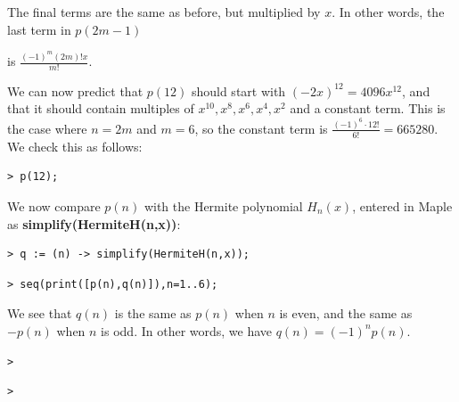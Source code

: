 \documentclass{article}
\begin{document}
\begin{Maple Normal}
The final terms are the same as before, but multiplied by 
$x$.  In other words, the last term in 
$p (2 m -1)$ 
\end{Maple Normal}
\begin{Maple Normal}
is 
$\frac{(-1)^{m} (2 m)! x}{m !}$. 
\end{Maple Normal}
\begin{Maple Normal}

\end{Maple Normal}
\begin{Maple Normal}
We can now predict that 
$p (12)$ should start with 
$(-2 x)^{12}=4096 x^{12}$, and that it should contain multiples of 
$x^{10},x^{8},x^{6},x^{4},x^{2}$ and a constant term.  This is the case where 
$n =2 m$ and 
$m =6$, so the constant term is 
$\frac{(-1)^{6}\cdot 12!}{6!}=665280$.  We check this as follows:
\end{Maple Normal}
\begin{lstlisting}
> p(12);
\end{lstlisting}
\begin{Maple Normal}
We now compare 
$p (n)$ with the Hermite polynomial 
$H_{n}(x)$, entered in Maple as \textcolor[RGB]{255,0,0}{\textbf{simplify(HermiteH(n,x))}}:
\end{Maple Normal}
\begin{lstlisting}
> q := (n) -> simplify(HermiteH(n,x));
\end{lstlisting}
\begin{lstlisting}
> seq(print([p(n),q(n)]),n=1..6);
\end{lstlisting}
\begin{Maple Normal}
We see that 
$q (n)$ is the same as 
$p (n)$ when 
$n$ is even, and the same as 
$-p (n)$ when 
$n$ is odd.  In other words, we have 
$q (n)=(-1)^{n} p (n)$.
\end{Maple Normal}
\begin{lstlisting}
> 
\end{lstlisting}
\begin{lstlisting}
> 
\end{lstlisting}
\end{document}
